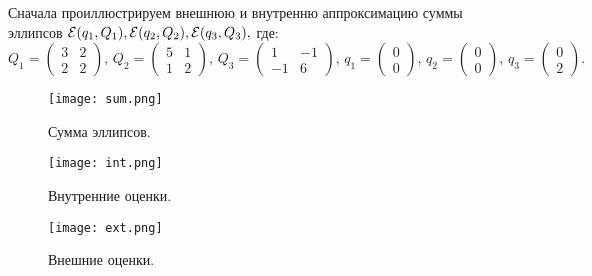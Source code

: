 \documentclass[16pt]{article}
\begin{document}
Сначала проиллюстрируем внешнюю и внутренню аппроксимацию суммы эллипсов $\mathcal{E}(q_1, Q_1), \\ \mathcal{E}(q_2, Q_2), \mathcal{E}(q_3, Q_3),$ где:
$$Q_1 = 
\begin{pmatrix}
  3& 2\\
  2& 2
\end{pmatrix}, \,
Q_2 = 
\begin{pmatrix}
  5& 1\\
  1& 2
\end{pmatrix},\,
Q_3 = 
\begin{pmatrix}
  1& -1\\
  -1& 6
\end{pmatrix},\,
q_1 = 
\begin{pmatrix}
  0\\
  0
\end{pmatrix},\,
q_2 = 
\begin{pmatrix}
  0\\
  0
\end{pmatrix},\,
q_3 = 
\begin{pmatrix}
  0\\
  2
\end{pmatrix}.
$$
\begin{figure}[h]
	\center
    \texttt{[image: sum.png]}
    \caption{Сумма эллипсов.}
\end{figure}

\begin{figure}
	\center
    \texttt{[image: int.png]}
    \caption{Внутренние оценки.}
\end{figure}

\begin{figure}
	\center
    \texttt{[image: ext.png]}
    \caption{Внешние оценки.}
\end{figure}
\end{document}
